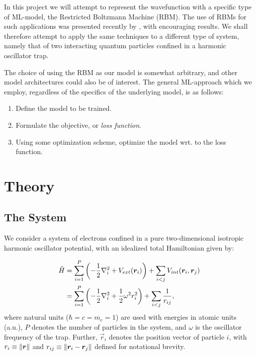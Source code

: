 \documentclass[a4paper, 11pt]{article}
\begin{document}
\begin{multicols}{2}
    In this project we will attempt to represent the wavefunction with a
    specific type of ML-model, the Restricted Boltzmann Machine (RBM). The use
    of RBMs for such applications was presented recently by
    \textcite{Carleo602}, with encouraging results. We shall therefore attempt
    to apply the same techniques to a different type of system, namely that of
    two interacting quantum particles confined in a harmonic oscillator trap.

    The choice of using the RBM as our model is somewhat arbitrary, and other
    model architectures could also be of interest. The general ML-approach which
    we employ, regardless of the specifics of the underlying model, is as follows:

    \begin{enumerate}
        \item Define the model to be trained.
        \item Formulate the objective, or \emph{loss function}.
        \item Using some optimization scheme, optimize the model wrt. to the
            loss function.
    \end{enumerate}


    \section{Theory}

    \subsection{The System}

    We consider a system of electrons confined in a pure two-dimensional
    isotropic harmonic oscillator potential, with an idealized total Hamiltonian
    given by:

    \begin{align}
        \begin{split}
            \hat H &= \sum_{i=1}^P\qty(-\frac{1}{2}\laplacian_i + V_{ext}(\vec r_i)) +
            \sum_{i < j} V_{int}(\vec r_i, \vec r_j)\\
            &= \sum_{i=1}^P\qty(-\frac{1}{2}\laplacian_i + \frac{1}{2}\omega^2
            r_i^2) + \sum_{i < j} \frac{1}{r_{ij}},
        \end{split}\label{eq:H-def}
    \end{align}
    where natural units ($\hbar=c=m_e=1$) are used with energies in
    atomic units (a.u.), $P$ denotes the number of particles in the system, and
    $\omega$ is the oscillator frequency of the trap. Further, $\vec r_i$
    denotes the position vector of particle $i$, with $r_i \equiv \norm{\bm r}$ and
    $r_{ij}\equiv \norm{\bm r_i - \bm r_j}$ defined for notational brevity.


\end{multicols}
\end{document}
